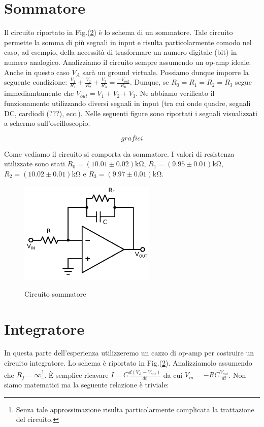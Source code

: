 \section{Sommatore}

Il circuito riportato in Fig.(\ref{}) è lo schema di un sommatore.
Tale circuito permette la somma di più segnali in input e risulta particolarmente comodo nel caso, ad esempio, della necessità di trasformare un numero digitale (bit) in numero analogico.
Analizziamo il circuito sempre assumendo un op-amp ideale.
Anche in questo caso $V_A$ sarà un ground virtuale.
Possiamo dunque imporre la seguente condizione: $\frac{V_1}{R_1}+\frac{V_2}{R_2}+\frac{V_3}{R_3}=\frac{-V_{out}}{R_0}$.
Dunque, se $R_0=R_1=R_2=R_3$ segue immediamtamente che $V_{out}=V_1+V_2+V_3$.
Ne abbiamo verificato il funzionamento utilizzando diversi segnali in input (tra cui onde quadre, segnali DC, cardiodi (???), ecc.).
Nelle seguenti figure sono riportati i segnali visualizzati a schermo sull'oscilloscopio.

$$grafici$$

Come vediamo il circuito si comporta da sommatore. I valori di resistenza utilizzate sono stati $R_0=(10.01\pm0.02)\si{\kilo\ohm}$, $R_1=(9.95\pm0.01)\si{\kilo\ohm}$, $R_2=(10.02\pm 0.01)\si{\kilo\ohm}$ e $R_3=(9.97\pm0.01)\si{\kilo\ohm}$.

\begin{figure}
	\caption{Circuito sommatore}
	\includegraphics[width=65mm]{ccint.pdf}
	\label{fig:ccsum}
\end{figure}

\section{Integratore}

In questa parte dell'esperienza utilizzeremo un cazzo di op-amp per costruire un circuito integratore. Lo schema è riportato in Fig.(\ref{}). Analizziamolo assumendo che $R_f=\infty$\footnote{Senza tale approssimazione risulta particolarmente complicata la trattazione del circuito.}. È semplice ricavare $I=C\frac{d(V_A-V_{out})}{dt}$ da cui $V_{in}=-RC\frac{V_{out}}{dt}$. Non siamo matematici ma la seguente relazione è triviale:

